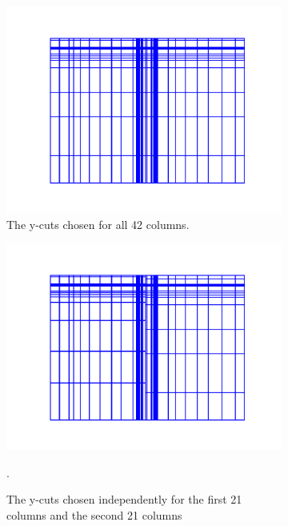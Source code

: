 \documentclass[times,final]{elsarticle}
\begin{document}
\begin{figure}[h]
\centering
  \begin{subfigure}[t]{\textwidth}
    \centering
\includegraphics[scale=0.5]{../figures/lvl2_suite_0.pdf}
  \caption{The y-cuts chosen for all 42 columns.}
    \label{42}
  \end{subfigure}
  \begin{subfigure}[b]{\textwidth}
    \centering
\includegraphics[scale=0.5]{../figures/lvl2_suite_1.pdf}
    \caption{The y-cuts chosen independently for the first 21 columns and the second 21 columns}.
    \label{21}
  \end{subfigure}
  \begin{subfigure}[b]{\textwidth}
    \centering

\end{subfigure}
\end{figure}
\end{document}

